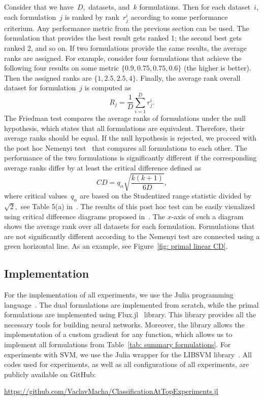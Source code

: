Consider that we have~$D,$ datasets, and~$k$ formulations. Then for each dataset~$i$, each formulation~$j$ is ranked by rank~$r^i_j$ according to some performance criterium. Any performance metric from the previous section can be used. The formulation that provides the best result gets ranked 1; the second best gets ranked 2, and so on. If two formulations provide the same results, the average ranks are assigned. For example, consider four formulations that achieve the following four results on some metric $\{0.9, 0.75, 0.75, 0.6\}$ (the higher is better). Then the assigned ranks are $\{1, 2.5, 2.5, 4\}$. Finally, the average rank overall dataset for formulation~$j$ is computed as
\begin{equation*}
  R_j = \frac{1}{D} \sum_{i = 1}^{D} r^{i}_{j}.
\end{equation*}
The Friedman test compares the average ranks of formulations under the null hypothesis, which states that all formulations are equivalent. Therefore, their average ranks should be equal. If the null hypothesis is rejected, we proceed with the post hoc Nemenyi test~\cite{nemenyi1963distribution} that compares all formulations to each other. The performance of the two formulations is significantly different if the corresponding average
ranks differ by at least the critical difference defined as
\begin{equation*}
  CD = q_{\alpha} \sqrt{\frac{k(k + 1)}{6D}},
\end{equation*}
where critical values~$q_{\alpha}$ are based on the Studentized range statistic divided by~$\sqrt{2},$ see Table 5(a) in~\cite{demvsar2006statistical}. The results of this post hoc test can be easily visualized using critical difference diagrams proposed in~\cite{demvsar2006statistical}. The $x$-axis of such a diagram shows the average rank over all datasets for each formulation. Formulations that are not significantly different according to the Nemenyi test are connected using a green horizontal line. As an example, see Figure~\ref{fig: primal linear CD}.

\subsection{Implementation}

For the implementation of all experiments, we use the Julia programming language~\cite{bezanson2017julia}. The dual formulations are implemented from scratch, while the primal formulations are implemented using Flux.jl~\cite{innes:2018, Flux.jl-2018} library. This library provides all the necessary tools for building neural networks. Moreover, the library allows the implementation of a custom gradient for any function, which allows us to implement all formulations from Table~\ref{tab: summary formulations}. For experiments with SVM, we use the Julia wrapper for the LIBSVM library~\cite{chang2011libsvm}. All codes used for experiments, as well as all configurations of all experiments, are publicly available on GitHub:
\begin{center}
  \url{https://github.com/VaclavMacha/ClassificationAtTopExperiments.jl}
\end{center}

